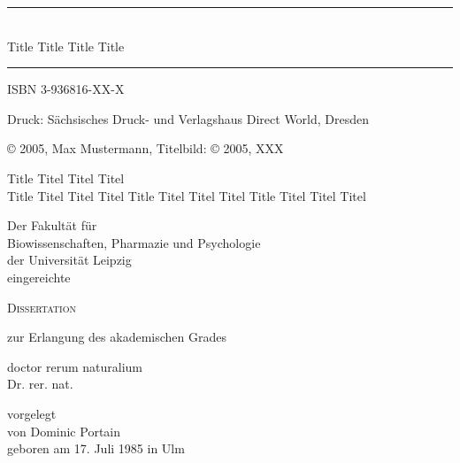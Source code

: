 
\thispagestyle{empty}
\begin{titlepage}


\vspace*{3cm}

\begin{center}
  \rule{14.5cm}{0.5mm}\\
  \vspace{0.5cm}
  \huge
  Title Title Title Title
  \rule{14.5cm}{0.5mm}
\end{center}

\clearpage
\thispagestyle{empty}
\vspace*{18cm}
\footnotesize{
ISBN 3-936816-XX-X
\vspace{1cm}

Druck: S\"achsisches Druck- und Verlagshaus Direct World, Dresden

\copyright \hspace*{1.5mm} 2005, Max Mustermann, Titelbild: \copyright \hspace*{1.5mm} 2005, XXX
}
\clearpage
\thispagestyle{empty}


\begin{center}
\normalsize
  {\huge Title Titel Titel Titel\\Title Titel Titel Titel Title Titel Titel Titel Title Titel Titel Titel}

  \vfill

  Der Fakult\"at für\\
  Biowissenschaften, Pharmazie und Psychologie\\
  der Universit\"at Leipzig\\
  eingereichte

  \vfill

  {\LARGE \textsc{Dissertation}}

  zur Erlangung des akademischen Grades

  doctor rerum naturalium\\
  Dr. rer. nat.

  \vfill

  vorgelegt\\
  von Dominic Portain\\
  geboren am 17. Juli 1985 in Ulm


\end{center}
\end{titlepage}
